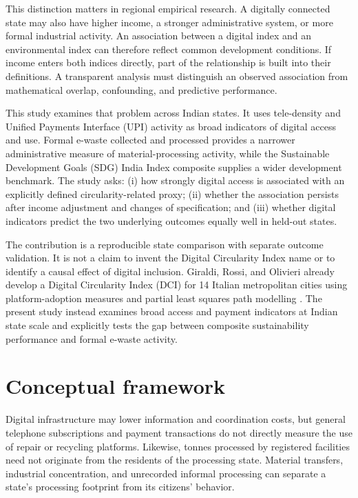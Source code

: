 \documentclass[11pt,a4paper]{article}
\begin{document}
This distinction matters in regional empirical research. A digitally connected state may also have higher income, a stronger administrative system, or more formal industrial activity. An association between a digital index and an environmental index can therefore reflect common development conditions. If income enters both indices directly, part of the relationship is built into their definitions. A transparent analysis must distinguish an observed association from mathematical overlap, confounding, and predictive performance.

This study examines that problem across Indian states. It uses tele-density and Unified Payments Interface (UPI) activity as broad indicators of digital access and use. Formal e-waste collected and processed provides a narrower administrative measure of material-processing activity, while the Sustainable Development Goals (SDG) India Index composite supplies a wider development benchmark. The study asks: (i) how strongly digital access is associated with an explicitly defined circularity-related proxy; (ii) whether the association persists after income adjustment and changes of specification; and (iii) whether digital indicators predict the two underlying outcomes equally well in held-out states.

The contribution is a reproducible state comparison with separate outcome validation. It is not a claim to invent the Digital Circularity Index name or to identify a causal effect of digital inclusion. Giraldi, Rossi, and Olivieri already develop a Digital Circularity Index (DCI) for 14 Italian metropolitan cities using platform-adoption measures and partial least squares path modelling \cite{giraldi}. The present study instead examines broad access and payment indicators at Indian state scale and explicitly tests the gap between composite sustainability performance and formal e-waste activity.

\section{Conceptual framework}
Digital infrastructure may lower information and coordination costs, but general telephone subscriptions and payment transactions do not directly measure the use of repair or recycling platforms. Likewise, tonnes processed by registered facilities need not originate from the residents of the processing state. Material transfers, industrial concentration, and unrecorded informal processing can separate a state's processing footprint from its citizens' behavior.
\end{document}

